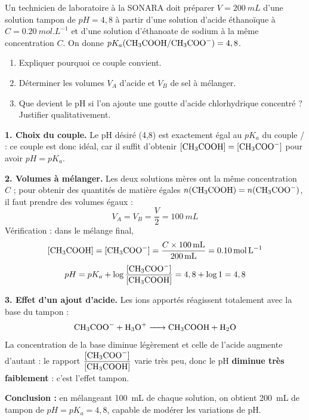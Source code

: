 \documentclass[11pt]{article}
\begin{document}
\begin{exoresolu}
Un technicien de laboratoire à la SONARA doit préparer $V = \SI{200}{mL}$ d'une solution tampon de $pH = 4,8$ à partir d'une solution d'acide éthanoïque à $C = \SI{0,20}{mol.L^{-1}}$ et d'une solution d'éthanoate de sodium  à la même concentration $C$. On donne $pK_a(\ce{CH3COOH}/\ce{CH3COO-}) = 4,8$.
\begin{enumerate}
\item Expliquer pourquoi ce couple convient.
\item Déterminer les volumes $V_A$ d'acide et $V_B$ de sel à mélanger.
\item Que devient le pH si l'on ajoute une goutte d'acide chlorhydrique concentré ? Justifier qualitativement.
\end{enumerate}
\tcblower
\textbf{1. Choix du couple.} Le pH désiré (4,8) est exactement égal au $pK_a$ du couple / : ce couple est donc idéal, car il suffit d'obtenir $[\ce{CH3COOH}] = [\ce{CH3COO-}]$ pour avoir $pH = pK_a$.

\textbf{2. Volumes à mélanger.} Les deux solutions mères ont la même concentration $C$ ; pour obtenir des quantités de matière égales $n(\ce{CH3COOH}) = n(\ce{CH3COO-})$, il faut prendre des volumes égaux :
\[ V_A = V_B = \frac{V}{2} = \SI{100}{mL} \]
Vérification : dans le mélange final, 
\[ [\ce{CH3COOH}] = [\ce{CH3COO-}] = \frac{C \times \SI{100}{mL}}{\SI{200}{mL}} = \SI{0,10}{mol.L^{-1}} \]
\[ pH = pK_a + \log\frac{[\ce{CH3COO-}]}{[\ce{CH3COOH}]} = 4,8 + \log 1 = 4,8 \]

\textbf{3. Effet d'un ajout d'acide.} Les ions  apportés réagissent totalement avec la base du tampon :
\[ \ce{CH3COO- + H3O+ -> CH3COOH + H2O} \]
La concentration de la base  diminue légèrement et celle de l'acide  augmente d'autant : le rapport $\dfrac{[\ce{CH3COO-}]}{[\ce{CH3COOH}]}$ varie très peu, donc le pH \textbf{diminue très faiblement} : c'est l'effet tampon.

\textbf{Conclusion :} en mélangeant \SI{100}{mL} de chaque solution, on obtient \SI{200}{mL} de tampon de $pH = pK_a = 4,8$, capable de modérer les variations de pH.
\end{exoresolu}
\end{document}
